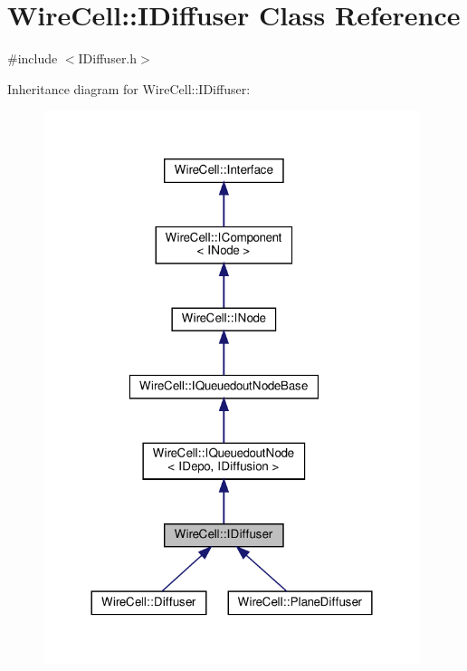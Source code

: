 \hypertarget{class_wire_cell_1_1_i_diffuser}{}\section{Wire\+Cell\+:\+:I\+Diffuser Class Reference}
\label{class_wire_cell_1_1_i_diffuser}


{\ttfamily \#include $<$I\+Diffuser.\+h$>$}



Inheritance diagram for Wire\+Cell\+:\+:I\+Diffuser\+:
\nopagebreak
\begin{figure}[H]
\begin{center}
\leavevmode
\includegraphics[width=312pt]{class_wire_cell_1_1_i_diffuser__inherit__graph}
\end{center}
\end{figure}


